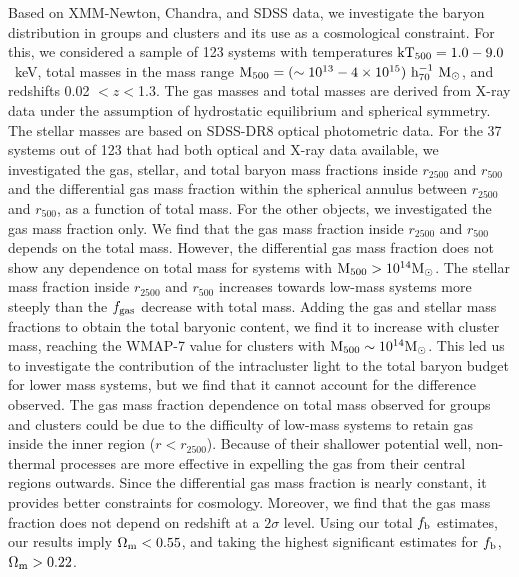 \documentclass{aa}
\begin{document}
\abstract
{} {Based on XMM-Newton, Chandra, and SDSS data, we investigate the
  baryon distribution in groups and clusters and its use as a
  cosmological constraint.  For this, we considered a sample of 123
  systems with temperatures  ${\rm kT_{500}} = 1.0-9.0$~keV, total
  masses in the mass range  ${\rm M_{500} = (\sim 10^{13} - 4 \times
  10^{15})\ h_{70}^{-1} \ M_{\odot}}$, and redshifts 0.02 $< z <$1.3.}
{The gas masses and total masses are derived from X-ray data under the
  assumption of hydrostatic equilibrium and spherical symmetry.  The
  stellar masses are based on SDSS-DR8 optical photometric data. For
  the 37 systems out of 123 that had both optical and X-ray data
  available, we investigated the gas, stellar, and total baryon mass
  fractions inside $r_{2500}$ and $r_{500}$ and the differential gas mass
  fraction within the spherical annulus between $r_{2500}$ and $r_{500}$, as a
  function of total mass. For the other objects, we investigated the
  gas mass fraction only.}
{We find that the gas mass fraction inside $r_{2500}$ and $r_{500}$
  depends on the total mass.
  However, the differential gas mass fraction does not show any
  dependence on total mass for systems with ${\rm M_{500} > 10^{14}
    M_{\odot}}$.  The stellar mass fraction inside $r_{2500}$ and
  $r_{500}$ increases towards low-mass systems more steeply than the
  $f_{\rm gas}$ decrease with total mass.  
 Adding the gas and stellar mass fractions to obtain the total
baryonic content, we find it to increase with cluster mass, reaching
the WMAP-7 value for clusters
  with ${\rm M_{500} \sim 10^{14} M_{\odot}}$.  This led us to investigate
  the contribution of the intracluster light to the total baryon
  budget for lower mass systems, but we find that it cannot account for the difference observed.}
{The gas mass fraction dependence on total mass observed for groups
  and clusters could be due to the difficulty of low-mass systems
  to retain gas inside the inner region ($r < r_{2500}$).  Because of 
  their shallower potential well, non-thermal processes are more
  effective in expelling the gas from their central regions
  outwards. Since the differential gas mass fraction is nearly
  constant, it provides better constraints for cosmology.  Moreover, we find
  that the gas mass fraction does not depend on redshift at a
  $2\sigma$ level.  Using our total $f_{\rm b}$ estimates, our
  results imply $\Omega_{\rm m} < 0.55$, and taking the highest
  significant estimates for $f_{\rm b}$, $\Omega_{\rm m} > 0.22$.}
\end{document}

